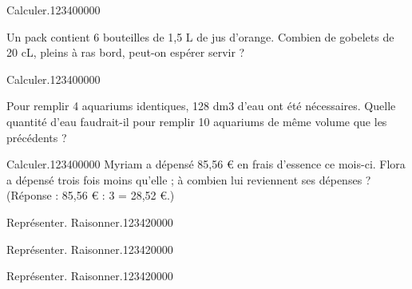   



\begin{pageParcoursd} 

\begin{ExoCd}{Calculer.}{1234}{0}{0}{0}{0}{0}

 Un pack contient 6 bouteilles de 1,5 L de jus d’orange. Combien de gobelets de 20 cL, pleins à 
ras bord, peut-on espérer servir ?  

 
\end{ExoCd}

\begin{ExoCd}{Calculer.}{1234}{0}{0}{0}{0}{0}

Pour remplir 4 aquariums identiques, 128 dm3 d’eau ont été nécessaires. Quelle quantité d’eau 
faudrait-il pour remplir 10 aquariums de même volume que les précédents ?
 
\end{ExoCd}


\begin{ExoCd}{Calculer.}{1234}{0}{0}{0}{0}{0}
Myriam a dépensé 85,56 € en frais d’essence ce mois-ci. Flora a dépensé trois fois moins 
qu’elle ; à combien lui reviennent ses dépenses ? (Réponse : 85,56 € : 3 = 28,52 €.)
\end{ExoCd}


\begin{ExoCd}{Représenter. Raisonner.}{1234}{2}{0}{0}{0}{0}


\end{ExoCd}

\begin{ExoCd}{Représenter. Raisonner.}{1234}{2}{0}{0}{0}{0}


\end{ExoCd}
 
\begin{ExoCd}{Représenter. Raisonner.}{1234}{2}{0}{0}{0}{0}


\end{ExoCd}
 
\end{pageParcoursd}

